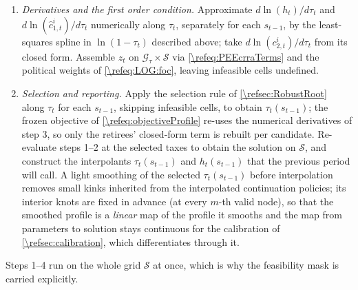 \begin{alg}
\begin{enumerate}
    \item \emph{Derivatives and the first order condition.} Approximate $d\ln(h_t)/d\tau_t$ and $d\ln(\hat{c}_{1,t}^i)/d\tau_t$ numerically along $\tau_t$, separately for each $s_{t-1}$, by the least-squares spline in $\ln(1-\tau_t)$ described above; take $d\ln(c_{2,t}^i)/d\tau_t$ from its closed form. Assemble $z_t$ on $\mathcal{G}_{\tau}\times\mathcal{S}$ via \eqref{\refeq:PEEcrraTerms} and the political weights of \eqref{\refeq:LOG:foc}, leaving infeasible cells undefined.

    \item \emph{Selection and reporting.} Apply the selection rule of \cref{\refsec:RobustRoot} along $\tau_t$ for each $s_{t-1}$, skipping infeasible cells, to obtain $\tau_t(s_{t-1})$; the frozen objective of \eqref{\refeq:objectiveProfile} re-uses the numerical derivatives of step 3, so only the retirees' closed-form term is rebuilt per candidate. Re-evaluate steps 1--2 at the selected taxes to obtain the solution on $\mathcal{S}$, and construct the interpolants $\tau_t(s_{t-1})$ and $h_t(s_{t-1})$ that the previous period will call. A light smoothing of the selected $\tau_t(s_{t-1})$ before interpolation removes small kinks inherited from the interpolated continuation policies; its interior knots are fixed in advance (at every $m$-th valid node), so that the smoothed profile is a \emph{linear} map of the profile it smooths and the map from parameters to solution stays continuous for the calibration of \cref{\refsec:calibration}, which differentiates through it.
\end{enumerate}
Steps 1--4 run on the whole grid $\mathcal{S}$ at once, which is why the feasibility mask is carried explicitly.
\end{alg}
